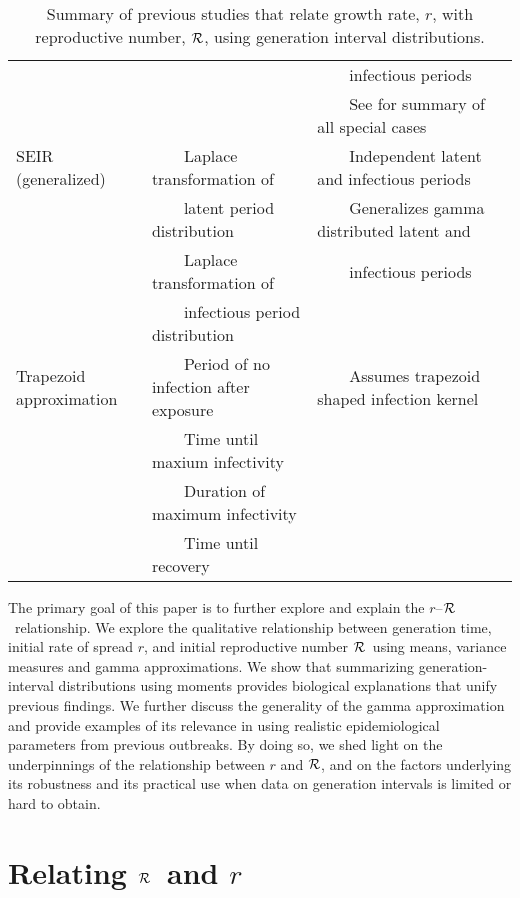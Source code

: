 \documentclass[12pt]{article}
\newcommand{\rR}{\mbox{$r$--$\cal R$}}
\newcommand{\RR}{\ensuremath{{\cal R}}}
\newcommand{\tlab}[1]{\label{tab:#1}}
\newcommand{\tabitem}{~~\llap{\textbullet}~~}
\newcommand{\tabphant}{\hphantom\tabitem}
\begin{document}
{\begin{landscape}
\begin{table}[h]
\begin{tabular}{l|l|l|c}
& & \tabphant infectious periods & \\
& & \tabitem See \cite{yan2008separate} for summary of all special cases & \\
\hline
SEIR (generalized) & \tabitem Laplace transformation of & \tabitem Independent latent and infectious periods & \cite{yan2008separate} \\
 & \tabphant latent period distribution & \tabitem Generalizes gamma distributed latent and & \\
 & \tabitem Laplace transformation of & \tabphant infectious periods & \\
 & \tabphant infectious period distribution & & \\
\hline
Trapezoid approximation & \tabitem Period of no infection after exposure & \tabitem Assumes trapezoid shaped infection kernel & \cite{roberts2007model} \\
& \tabitem Time until maxium infectivity& & \\
& \tabitem Duration of maximum infectivity & & \\
& \tabitem Time until recovery & &\\
\hline
\end{tabular}
\caption{
Summary of previous studies that relate growth rate, $r$, with reproductive number, $\RR$, using generation interval distributions.
}
\tlab{review}
\end{table}
\end{landscape}
}

The primary goal of this paper is to further explore and explain the \rR\ relationship.
We explore the qualitative relationship between generation time, initial rate of spread $r$, and initial reproductive number \RR\ using means, variance measures and gamma approximations.
We show that summarizing generation-interval distributions using moments provides biological explanations that unify previous findings.
We further discuss the generality of the gamma approximation and provide examples of its relevance in using realistic epidemiological parameters from previous outbreaks.
By doing so, we shed light on the underpinnings of the relationship between $r$ and \RR, and on the factors underlying its robustness and its practical use when data on generation intervals is limited or hard to obtain.

\section{Relating \RR\ and $r$}
\end{document}
